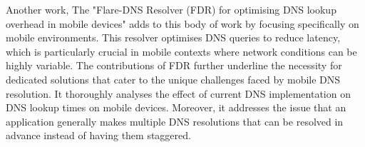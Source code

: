 \documentclass{article}
\begin{document}
Another work, The "Flare-DNS Resolver (FDR) for optimising DNS lookup overhead in mobile devices" \cite{flare-dns} adds to this body of work by focusing specifically on mobile environments. This resolver optimises DNS queries to reduce latency, which is particularly crucial in mobile contexts where network conditions can be highly variable. The contributions of FDR further underline the necessity for dedicated solutions that cater to the unique challenges faced by mobile DNS resolution. It thoroughly analyses the effect of current DNS implementation on DNS lookup times on mobile devices. Moreover, it addresses the issue that an application generally makes multiple DNS resolutions that can be resolved in advance instead of having them staggered. 

\end{document}
